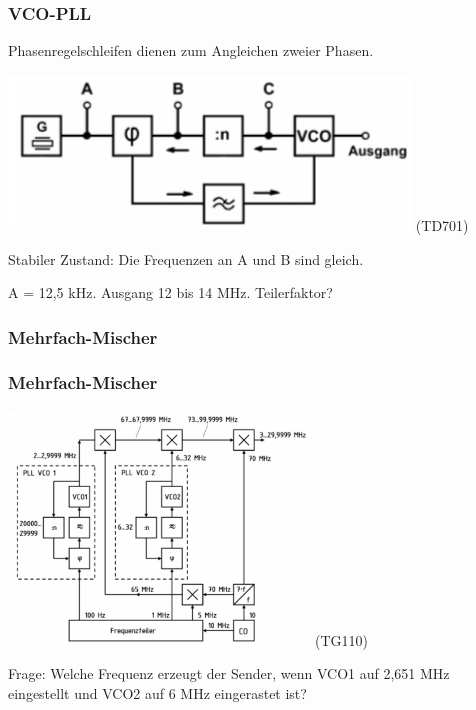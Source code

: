 \begin{frame}
    \frametitle{VCO-PLL}

    Phasenregelschleifen dienen zum Angleichen zweier Phasen.

    \begin{center}
        \includegraphics[width=0.8\textwidth]{a13/TD701.png}
        \tiny (TD701)
    \end{center}

    Stabiler Zustand: Die Frequenzen an A und B sind gleich.

    A = 12,5 kHz. Ausgang 12 bis 14 MHz. Teilerfaktor?

\end{frame}

\subsubsection{Mehrfach-Mischer}

\begin{frame}
    \frametitle{Mehrfach-Mischer}


    \begin{center}
        \includegraphics[width=0.6\textwidth]{a13/TG110.png}
        \tiny (TG110)
    \end{center}

    Frage: Welche Frequenz erzeugt der Sender, wenn VCO1 auf 2,651 MHz
    eingestellt und VCO2 auf 6 MHz eingerastet ist? 

\end{frame}


